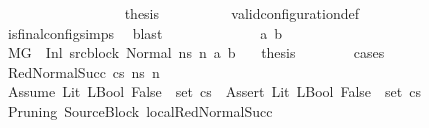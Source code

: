 \begin{isabellebody}
\ \ \ \ \ \ \isamarkupfalse%
\ {}\isanewline
\ \ \ \ \ \ \isamarkupfalse%
\ \isamarkupfalse%
\ {\isacharquery}{\kern0pt}thesis\isanewline
\ \ \ \ \ \ \ \ \isamarkupfalse%
\ valid{\isacharunderscore}{\kern0pt}configuration{\isacharunderscore}{\kern0pt}def\isanewline
\ \ \ \ \ \ \ \ \isamarkupfalse%
\ is{\isacharunderscore}{\kern0pt}final{\isacharunderscore}{\kern0pt}config{\isachardot}{\kern0pt}simps{\isacharparenleft}{\kern0pt}{}{\isacharparenright}{\kern0pt}\ \isamarkupfalse%
\ blast\isanewline
\ \ \ \ \isamarkupfalse%
\isanewline
\ \ \ \ \ \ \isamarkupfalse%
\ {\isacharparenleft}{\kern0pt}{}\ a\ b{\isacharparenright}{\kern0pt}\isanewline
\ \ \ \ \ \ \isamarkupfalse%
\ {\isacartoucheopen}M{\isacharcomma}{\kern0pt}{\isasymLambda}{\isacharcomma}{\kern0pt}{\isasymGamma}{\isacharcomma}{\kern0pt}{\isasymOmega}{\isacharcomma}{\kern0pt}G\ {\isasymturnstile}\ {\isacharparenleft}{\kern0pt}Inl\ src{\isacharunderscore}{\kern0pt}block{\isacharcomma}{\kern0pt}\ Normal\ ns{\isacharparenright}{\kern0pt}\ {\isacharminus}{\kern0pt}n{\isasymrightarrow}\ {\isacharparenleft}{\kern0pt}a{\isacharcomma}{\kern0pt}\ b{\isacharparenright}{\kern0pt}{\isacartoucheclose}\ \ \isamarkupfalse%
\ {\isacharquery}{\kern0pt}thesis\isanewline
\ \ \ \ \ \ \isamarkupfalse%
\ cases\isanewline
\ \ \ \ \ \ \ \ \isamarkupfalse%
\ {\isacharparenleft}{\kern0pt}RedNormalSucc\ cs\ ns{\isacharprime}{\kern0pt}\ n{\isacharprime}{\kern0pt}{\isacharparenright}{\kern0pt}\isanewline
\ \ \ \ \ \ \ \ \isamarkupfalse%
\ {\isachardoublequoteopen}{\isacharparenleft}{\kern0pt}Assume\ {\isacharparenleft}{\kern0pt}Lit\ {\isacharparenleft}{\kern0pt}LBool\ False{\isacharparenright}{\kern0pt}{\isacharparenright}{\kern0pt}{\isacharparenright}{\kern0pt}\ {\isasymin}\ set\ {\isacharparenleft}{\kern0pt}cs{\isacharparenright}{\kern0pt}\ {\isasymor}\ {\isacharparenleft}{\kern0pt}Assert\ {\isacharparenleft}{\kern0pt}Lit\ {\isacharparenleft}{\kern0pt}LBool\ False{\isacharparenright}{\kern0pt}{\isacharparenright}{\kern0pt}{\isacharparenright}{\kern0pt}\ {\isasymin}\ set\ {\isacharparenleft}{\kern0pt}cs{\isacharparenright}{\kern0pt}{\isachardoublequoteclose}\isanewline
\ \ \ \ \ \ \ \ \ \ \isamarkupfalse%
\ Pruning\ SourceBlock\ local{\isachardot}{\kern0pt}RedNormalSucc{\isacharparenleft}{\kern0pt}{}{\isacharparenright}{\kern0pt}\ \isamarkupfalse%

\end{isabellebody}
